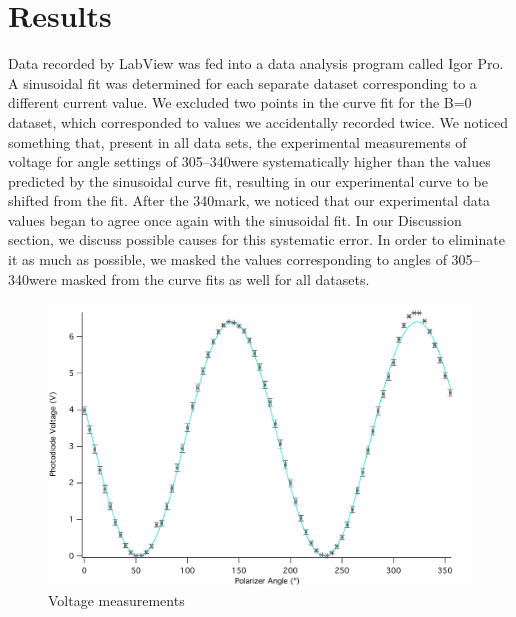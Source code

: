 \documentclass[prb,preprint]{revtex4-1}
\begin{document}
\section{Results}
{Data recorded by LabView was fed into a data analysis program called Igor Pro.  A sinusoidal fit was determined for each separate dataset corresponding to a different current value.  We excluded two points in the curve fit for the B=0 dataset, which corresponded to values we accidentally recorded twice. 
We noticed something that, present in all data sets, the experimental measurements of voltage for angle settings of 305\degree--340\degree were systematically higher than the values predicted by the sinusoidal curve fit, resulting in our experimental curve to be shifted from the fit.  After the 340\degree mark, we noticed that our experimental data values began to agree once again with the sinusoidal fit.  In our Discussion section, we discuss possible causes for this systematic error.  In order to eliminate it as much as possible, we masked the values corresponding to angles of 305\degree--340\degree were masked from the curve fits as well for all datasets.

\begin{figure}
\includegraphics[width = 6.3in]{0A.pdf}
\caption{\label{nofield}Voltage measurements }

\end{figure}

}
\end{document}
